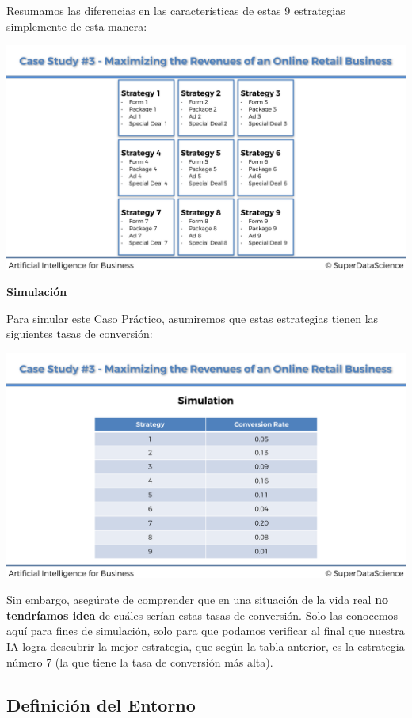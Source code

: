 \documentclass[
]{book}
\begin{document}
Resumamos las diferencias en las características de estas 9 estrategias simplemente de esta manera:

\includegraphics{Images/Strategies_Slide.png}

\textbf{Simulación}

Para simular este Caso Práctico, asumiremos que estas estrategias tienen las siguientes tasas de conversión:

\includegraphics{Images/Simulation_Slide.png}

Sin embargo, asegúrate de comprender que en una situación de la vida real \textbf{no tendríamos idea} de cuáles serían estas tasas de conversión. Solo las conocemos aquí para fines de simulación, solo para que podamos verificar al final que nuestra IA logra descubrir la mejor estrategia, que según la tabla anterior, es la estrategia número 7 (la que tiene la tasa de conversión más alta).

\hypertarget{definiciuxf3n-del-entorno}{%
\subsection{Definición del Entorno}\label{definiciuxf3n-del-entorno}}
\end{document}
